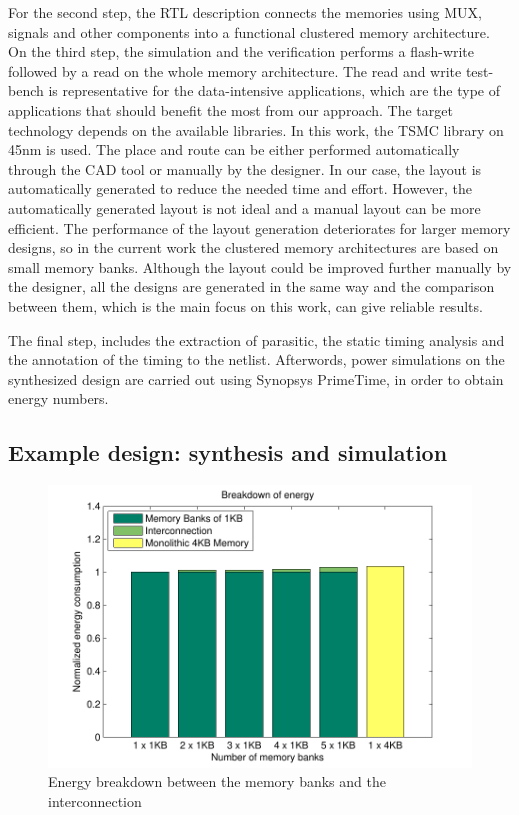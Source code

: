 For the second step, the RTL description connects the memories using MUX, signals and other components into a functional clustered memory architecture. 
On the third step, the simulation and the verification performs a flash-write followed by a read on the whole memory architecture. 
The read and write test-bench is representative for the data-intensive applications, which are the type of applications that should benefit the most from our approach. 
The target technology depends on the available libraries.
In this work, the TSMC library on 45nm is used.
The place and route can be either performed automatically through the CAD tool or manually by the designer.
In our case, the layout is automatically generated to reduce the needed time and effort. 
However, the automatically generated layout is not ideal and a manual layout can be more efficient.
The performance of the layout generation deteriorates for larger memory designs, so in the current work the clustered memory architectures are based on small memory banks.
Although the layout could be improved further manually by the designer, all the designs are generated in the same way and the comparison between them, which is the main focus on this work, can give reliable results.


The final step, includes the extraction of  parasitic, the static timing analysis and the annotation of the timing to the netlist.
Afterwords, power simulations on the synthesized design are carried out using Synopsys PrimeTime, in order to obtain energy numbers.

\subsection{Example design: synthesis and simulation}

\begin{figure}
 \centering
 \includegraphics[width = \textwidth]{E/energy.pdf}
  \caption{Energy breakdown between the memory banks and the interconnection}
 \label{fig:energyE}
 \end{figure}


